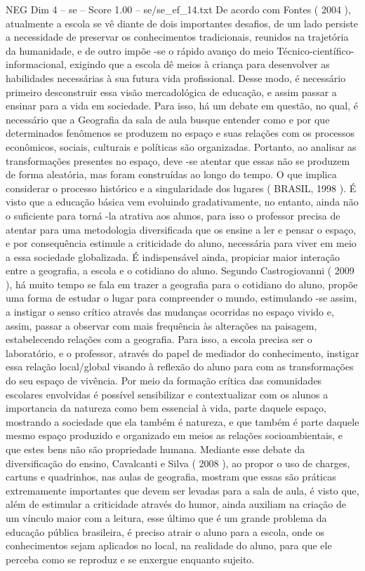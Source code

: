 \begin{textsample}{NEG Dim 4 – se – Score 1.00 – se/se\_ef\_14.txt}
De acordo com Fontes ( 2004 ), atualmente a escola se vê diante de dois importantes desafios, de um lado persiste a necessidade de preservar os conhecimentos tradicionais, reunidos na trajetória da humanidade, e de outro impõe -se o rápido avanço do meio Técnico-científico-informacional, exigindo que a escola dê meios à criança para desenvolver as habilidades necessárias à sua futura vida profissional.
Desse modo, é necessário primeiro desconstruir essa visão mercadológica de educação, e assim passar a ensinar para a vida em sociedade.
Para isso, há um debate em questão, no qual, é necessário que a Geografia da sala de aula busque entender como e por que determinados fenômenos se produzem no espaço e suas relações com os processos econômicos, sociais, culturais e políticas são organizadas.
Portanto, ao analisar as transformações presentes no espaço, deve -se atentar que essas não se produzem de forma aleatória, mas foram construídas ao longo do tempo.
O que implica considerar o processo histórico e a singularidade dos lugares ( BRASIL, 1998 ).
É visto que a educação básica vem evoluindo gradativamente, no entanto, ainda não o suficiente para torná -la atrativa aos alunos, para isso o professor precisa de atentar para uma metodologia diversificada que os ensine a ler e pensar o espaço, e por consequência estimule a criticidade do aluno, necessária para viver em meio a essa sociedade globalizada.
É indispensável ainda, propiciar maior interação entre a geografia, a escola e o cotidiano do aluno.
Segundo Castrogiovanni ( 2009 ), há muito tempo se fala em trazer a geografia para o cotidiano do aluno, propõe uma forma de estudar o lugar para compreender o mundo, estimulando -se assim, a instigar o senso crítico através das mudanças ocorridas no espaço vivido e, assim, passar a observar com mais frequência às alterações na paisagem, estabelecendo relações com a geografia.
Para isso, a escola precisa ser o laboratório, e o professor, através do papel de mediador do conhecimento, instigar essa relação local/global visando à reflexão do aluno para com as transformações do seu espaço de vivência.
Por meio da formação crítica das comunidades escolares envolvidas é possível sensibilizar e contextualizar com os alunos a importancia da natureza como bem essencial à vida, parte daquele espaço, mostrando a sociedade que ela também é natureza, e que também é parte daquele mesmo espaço produzido e organizado em meios as relações socioambientais, e que estes bens não são propriedade humana.
Mediante esse debate da diversificação do ensino, Cavalcanti e Silva ( 2008 ), ao propor o uso de charges, cartuns e quadrinhos, nas aulas de geografia, mostram que essas são práticas extremamente importantes que devem ser levadas para a sala de aula, é visto que, além de estimular a criticidade através do humor, ainda auxiliam na criação de um vínculo maior com a leitura, esse último que é um grande problema da educação pública brasileira, é preciso atrair o aluno para a escola, onde os conhecimentos sejam aplicados no local, na realidade do aluno, para que ele perceba como se reproduz e se enxergue enquanto sujeito.

\end{textsample}
